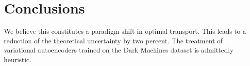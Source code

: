 \section{Conclusions}\label{sec:conclusions}

We believe this constitutes a paradigm shift in optimal transport. This
leads to a reduction of the theoretical uncertainty by two percent. The
treatment of variational autoencoders trained on the Dark Machines
dataset is admittedly heuristic.

